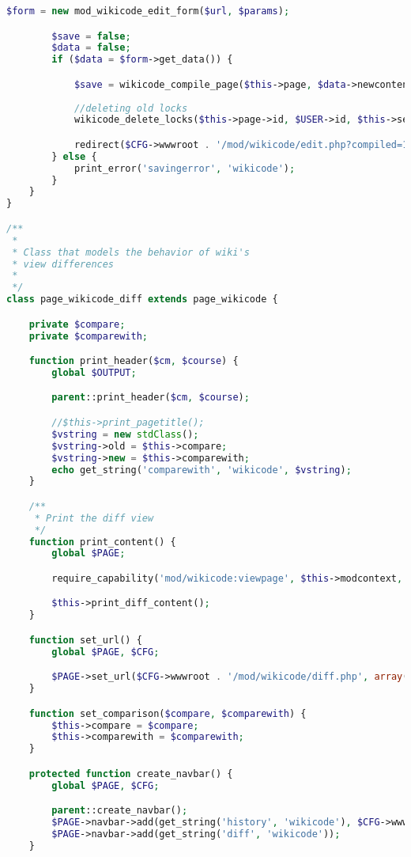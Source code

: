 \begin{lstlisting}[language=PHP]
        $form = new mod_wikicode_edit_form($url, $params);

        $save = false;
        $data = false;
        if ($data = $form->get_data()) {

            $save = wikicode_compile_page($this->page, $data->newcontent, $USER->id, $this->download);
      
            //deleting old locks
            wikicode_delete_locks($this->page->id, $USER->id, $this->section);

            redirect($CFG->wwwroot . '/mod/wikicode/edit.php?compiled=1&pageid=' . $this->page->id);
        } else {
            print_error('savingerror', 'wikicode');
        }
    }
}

/**
 *
 * Class that models the behavior of wiki's
 * view differences
 *
 */
class page_wikicode_diff extends page_wikicode {

    private $compare;
    private $comparewith;

    function print_header($cm, $course) {
        global $OUTPUT;

        parent::print_header($cm, $course);

        //$this->print_pagetitle();
        $vstring = new stdClass();
        $vstring->old = $this->compare;
        $vstring->new = $this->comparewith;
        echo get_string('comparewith', 'wikicode', $vstring);
    }

    /**
     * Print the diff view
     */
    function print_content() {
        global $PAGE;

        require_capability('mod/wikicode:viewpage', $this->modcontext, NULL, true, 'noviewpagepermission', 'wikicode');

        $this->print_diff_content();
    }

    function set_url() {
        global $PAGE, $CFG;

        $PAGE->set_url($CFG->wwwroot . '/mod/wikicode/diff.php', array('pageid' => $this->page->id, 'comparewith' => $this->comparewith, 'compare' => $this->compare));
    }

    function set_comparison($compare, $comparewith) {
        $this->compare = $compare;
        $this->comparewith = $comparewith;
    }

    protected function create_navbar() {
        global $PAGE, $CFG;

        parent::create_navbar();
        $PAGE->navbar->add(get_string('history', 'wikicode'), $CFG->wwwroot . '/mod/wikicode/history.php?pageid' . $this->page->id);
        $PAGE->navbar->add(get_string('diff', 'wikicode'));
    }


\end{lstlisting}
